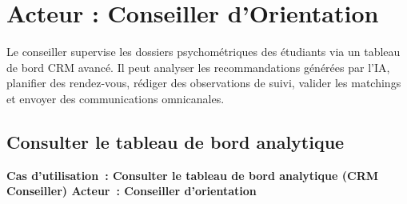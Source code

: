 \documentclass[a4paper,12pt]{article}
\newcommand{\ucheader}[2]{%
  \noindent\colorbox{capblue}{\parbox{\dimexpr\linewidth-2\fboxsep}{%
    \color{white}\bfseries\large Cas d'utilisation~: #1 \hfill \normalsize Acteur~: #2
  }}\\[2pt]
}
\begin{document}
\section{Acteur : Conseiller d'Orientation}

Le conseiller supervise les dossiers psychométriques des étudiants via un tableau de bord CRM avancé. Il peut analyser les recommandations générées par l'IA, planifier des rendez-vous, rédiger des observations de suivi, valider les matchings et envoyer des communications omnicanales.

\subsection{Consulter le tableau de bord analytique}
\ucheader{Consulter le tableau de bord analytique (CRM Conseiller)}{Conseiller d'orientation}
\end{document}
